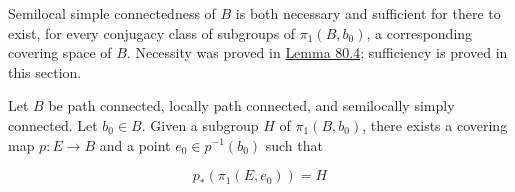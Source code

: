 Semilocal simple connectedness of \(B\) is both necessary and sufficient for there to exist, for every conjugacy class of subgroups of \({\pi }_{1}( {B,b_{0}})\), a corresponding covering space of \(B\). Necessity was proved in \hyperref[lem:80.4]{Lemma 80.4}; sufficiency is proved in this section.

\begin{theorem}
\label{thm:\thetheorem}
	Let \(B\) be path connected, locally path connected, and semilocally simply connected. Let \(b_{0} \in B\). Given a subgroup \(H\) of \({\pi }_{1}( {B,b_{0}})\), there exists a covering map \(p : E \rightarrow B\) and a point \(e_{0} \in {p}^{-1}( b_{0})\) such that

\[
p_{ * }( {{\pi }_{1}( {E,e_{0}}) }) = H
\]
\end{theorem}


